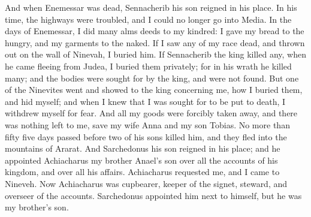 {\par }{\PP {}And when Enemessar was dead, Sennacherib his son reigned in his place. In his time, the highways were troubled, and I could no longer go into Media.
In the days of Enemessar, I did many alms deeds to my kindred: I gave my bread to the hungry,
and my garments to the naked. If I saw any of my race dead, and thrown out on the wall of Ninevah, I buried him.
If Sennacherib the king killed any, when he came fleeing from Judea, I buried them privately; for in his wrath he killed many; and the bodies were sought for by the king, and were not found.
But one of the Ninevites went and showed to the king concerning me, how I buried them, and hid myself; and when I knew that I was sought for to be put to death, I withdrew myself for fear.
And all my goods were forcibly taken away, and there was nothing left to me, save my wife Anna and my son Tobias.
No more than fifty five days passed before two of his sons killed him, and they fled into the mountains of Ararat. And Sarchedonus his son reigned in his place; and he appointed Achiacharus my brother Anael’s son over all the accounts of his kingdom, and over all his affairs.
Achiacharus requested me, and I came to Nineveh. Now Achiacharus was cupbearer, keeper of the signet, steward, and overseer of the accounts. Sarchedonus appointed him next to himself, but he was my brother’s son.

}
